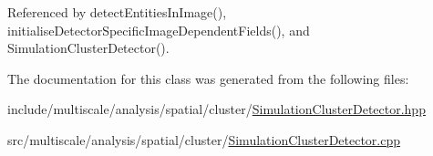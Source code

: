 Referenced by detect\-Entities\-In\-Image(), initialise\-Detector\-Specific\-Image\-Dependent\-Fields(), and Simulation\-Cluster\-Detector().



The documentation for this class was generated from the following files\-:\begin{DoxyCompactItemize}
\item 
include/multiscale/analysis/spatial/cluster/\hyperlink{SimulationClusterDetector_8hpp}{Simulation\-Cluster\-Detector.\-hpp}\item 
src/multiscale/analysis/spatial/cluster/\hyperlink{SimulationClusterDetector_8cpp}{Simulation\-Cluster\-Detector.\-cpp}\end{DoxyCompactItemize}
